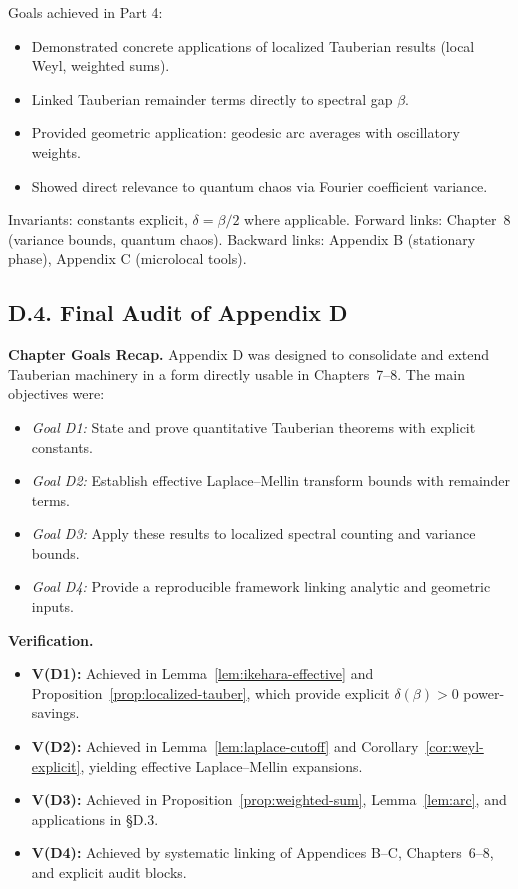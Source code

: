 \medskip

\begin{auditblock}[D4]
Goals achieved in Part 4:
\begin{itemize}
  \item Demonstrated concrete applications of localized Tauberian results (local Weyl, weighted sums).  
  \item Linked Tauberian remainder terms directly to spectral gap $\beta$.  
  \item Provided geometric application: geodesic arc averages with oscillatory weights.  
  \item Showed direct relevance to quantum chaos via Fourier coefficient variance.  
\end{itemize}
Invariants: constants explicit, $\delta=\beta/2$ where applicable.  
Forward links: Chapter~8 (variance bounds, quantum chaos).  
Backward links: Appendix B (stationary phase), Appendix C (microlocal tools).  
\end{auditblock}

\subsection*{D.4. Final Audit of Appendix D}

\noindent \textbf{Chapter Goals Recap.}  
Appendix D was designed to consolidate and extend Tauberian machinery in a form directly usable in Chapters~7--8.  
The main objectives were:

\begin{itemize}
  \item \emph{Goal D1:} State and prove quantitative Tauberian theorems with explicit constants.  
  \item \emph{Goal D2:} Establish effective Laplace--Mellin transform bounds with remainder terms.  
  \item \emph{Goal D3:} Apply these results to localized spectral counting and variance bounds.  
  \item \emph{Goal D4:} Provide a reproducible framework linking analytic and geometric inputs.  
\end{itemize}

\medskip

\noindent \textbf{Verification.}
\begin{itemize}
  \item \textbf{V(D1):} Achieved in Lemma~\ref{lem:ikehara-effective} and Proposition~\ref{prop:localized-tauber}, which provide explicit $\delta(\beta)>0$ power-savings.  
  \item \textbf{V(D2):} Achieved in Lemma~\ref{lem:laplace-cutoff} and Corollary~\ref{cor:weyl-explicit}, yielding effective Laplace--Mellin expansions.  
  \item \textbf{V(D3):} Achieved in Proposition~\ref{prop:weighted-sum}, Lemma~\ref{lem:arc}, and applications in \S D.3.  
  \item \textbf{V(D4):} Achieved by systematic linking of Appendices B--C, Chapters~6--8, and explicit audit blocks.  
\end{itemize}

